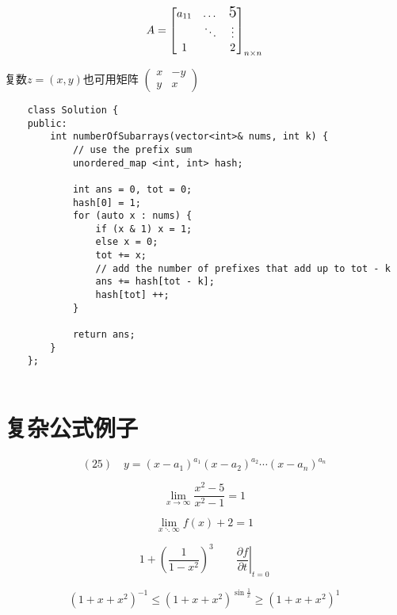 \documentclass{article}
\begin{document}
    \[
    A = \begin{bmatrix}
        a_{11} & \dots & \text{\Large5}\\ %
        & \ddots  & \vdots \\ %
        1 &  & 2    
    \end{bmatrix}_{n \times n} %
    \]

    复数$z = (x, y)$也可用矩阵 
    \begin{math}
    \left(\begin{smallmatrix}
    x & -y \\
    y & x   
    \end{smallmatrix}\right) %
    \end{math}

    \begin{verbatim}
    class Solution {
    public:
        int numberOfSubarrays(vector<int>& nums, int k) {
            // use the prefix sum
            unordered_map <int, int> hash;
             
            int ans = 0, tot = 0;
            hash[0] = 1;
            for (auto x : nums) {
                if (x & 1) x = 1;
                else x = 0;
                tot += x;
                // add the number of prefixes that add up to tot - k
                ans += hash[tot - k]; 
                hash[tot] ++;
            }
            
            return ans;
        }
    };
            
    \end{verbatim}


\section{复杂公式例子}
    \[
    (25)\quad y=\left(x-a_{1}\right)^{a_{1}}\left(x-a_{2}\right)^{a_{2}} \cdots\left(x-a_{n}\right)^{a_{n}}
    \]

    \[
    \lim _{x \rightarrow \infty} \frac{x^{2}-5}{x^{2}-1}=1
    \]

    $$\lim _{x \ddots \infty} {f(x)+ 2} = 1$$

    \[1 + \left(\frac{1}{1-x^{2}}
    \right)^3 \qquad
    \left.\frac{\partial f}{\partial t}
    \right|_{t=0}\]

    \[(1 + x + x^2)^{-1} \leqslant (1 + x + x^2)^{\sin\frac{1}{x}} \geqslant (1+x+x^2)^{1}\] %
\end{document}
